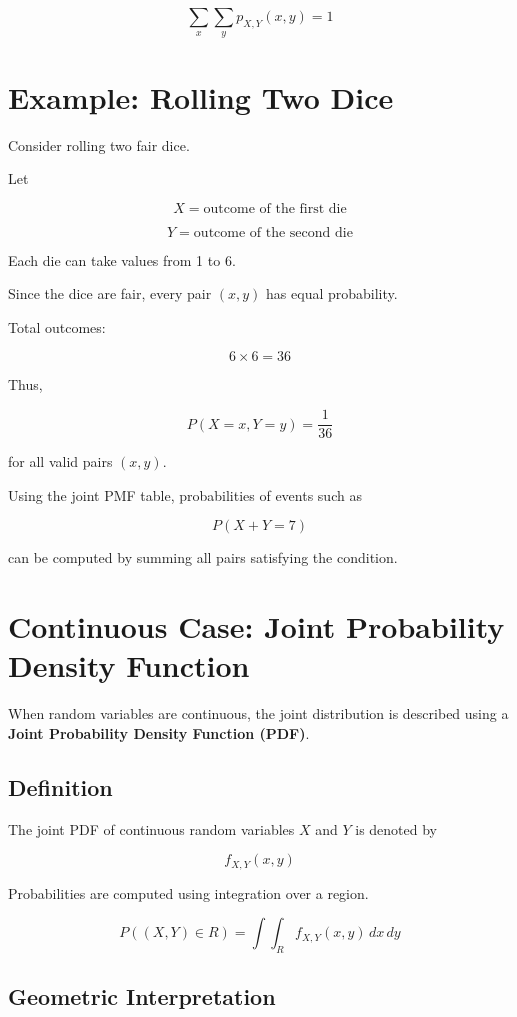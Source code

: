 \documentclass[12pt]{article}
\begin{document}
\[
\sum_x \sum_y p_{X,Y}(x,y) = 1
\]

\section{Example: Rolling Two Dice}

Consider rolling two fair dice.

Let

\[
X = \text{outcome of the first die}
\]

\[
Y = \text{outcome of the second die}
\]

Each die can take values from 1 to 6.

Since the dice are fair, every pair \((x,y)\) has equal probability.

Total outcomes:

\[
6 \times 6 = 36
\]

Thus,

\[
P(X=x, Y=y) = \frac{1}{36}
\]

for all valid pairs \((x,y)\).

Using the joint PMF table, probabilities of events such as

\[
P(X+Y=7)
\]

can be computed by summing all pairs satisfying the condition.

\section{Continuous Case: Joint Probability Density Function}

When random variables are continuous, the joint distribution is described using a \textbf{Joint Probability Density Function (PDF)}.

\subsection{Definition}

The joint PDF of continuous random variables \(X\) and \(Y\) is denoted by

\[
f_{X,Y}(x,y)
\]

Probabilities are computed using integration over a region.

\[
P((X,Y) \in R) = \int\int_R f_{X,Y}(x,y)\,dx\,dy
\]

\subsection{Geometric Interpretation}
\end{document}
